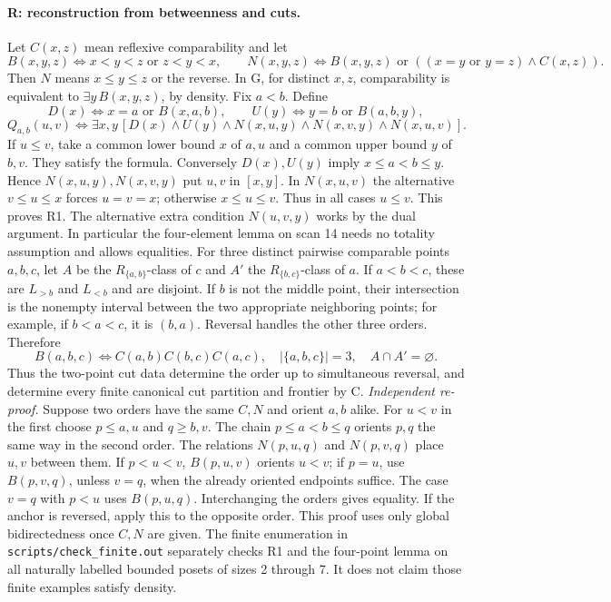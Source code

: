\paragraph{R: reconstruction from betweenness and cuts.}\label{lem:reconstruction}
Let $C(x,z)$ mean reflexive comparability and let
\[
 B(x,y,z)\iff x<y<z\text{ or }z<y<x,\qquad
 N(x,y,z)\iff B(x,y,z)\text{ or }((x=y\text{ or }y=z)\land C(x,z)).
\]
Then $N$ means $x\leq y\leq z$ or the reverse. In G, for distinct $x,z$, comparability is equivalent to $\exists y\,B(x,y,z)$, by density. Fix $a<b$. Define
\[
 D(x)\iff x=a\text{ or }B(x,a,b),\qquad
 U(y)\iff y=b\text{ or }B(a,b,y),
\]
\[
 Q_{a,b}(u,v)\iff\exists x,y\,[D(x)\land U(y)\land N(x,u,y)\land N(x,v,y)\land N(x,u,v)].                 \tag{R1}
\]
If $u\leq v$, take a common lower bound $x$ of $a,u$ and a common upper bound $y$ of $b,v$. They satisfy the formula. Conversely $D(x),U(y)$ imply $x\leq a<b\leq y$. Hence $N(x,u,y),N(x,v,y)$ put $u,v$ in $[x,y]$. In $N(x,u,v)$ the alternative $v\leq u\leq x$ forces $u=v=x$; otherwise $x\leq u\leq v$. Thus in all cases $u\leq v$. This proves R1. The alternative extra condition $N(u,v,y)$ works by the dual argument. In particular the four-element lemma on scan 14 needs no totality assumption and allows equalities.
For three distinct pairwise comparable points $a,b,c$, let $A$ be the $R_{\{a,b\}}$-class of $c$ and $A'$ the $R_{\{b,c\}}$-class of $a$. If $a<b<c$, these are $L_{>b}$ and $L_{<b}$ and are disjoint. If $b$ is not the middle point, their intersection is the nonempty interval between the two appropriate neighboring points; for example, if $b<a<c$, it is $(b,a)$. Reversal handles the other three orders. Therefore
\[
 B(a,b,c)\iff C(a,b)C(b,c)C(a,c),\quad |\{a,b,c\}|=3,\quad A\cap A'=\varnothing.                 \tag{R2}
\]
Thus the two-point cut data determine the order up to simultaneous reversal, and determine every finite canonical cut partition and frontier by C.
\emph{Independent re-proof.} Suppose two orders have the same $C,N$ and orient $a,b$ alike. For $u<v$ in the first choose $p\leq a,u$ and $q\geq b,v$. The chain $p\leq a<b\leq q$ orients $p,q$ the same way in the second order. The relations $N(p,u,q)$ and $N(p,v,q)$ place $u,v$ between them. If $p<u<v$, $B(p,u,v)$ orients $u<v$; if $p=u$, use $B(p,v,q)$, unless $v=q$, when the already oriented endpoints suffice. The case $v=q$ with $p<u$ uses $B(p,u,q)$. Interchanging the orders gives equality. If the anchor is reversed, apply this to the opposite order. This proof uses only global bidirectedness once $C,N$ are given. The finite enumeration in \texttt{scripts/check\_finite.out} separately checks R1 and the four-point lemma on all naturally labelled bounded posets of sizes 2 through 7. It does not claim those finite examples satisfy density.

